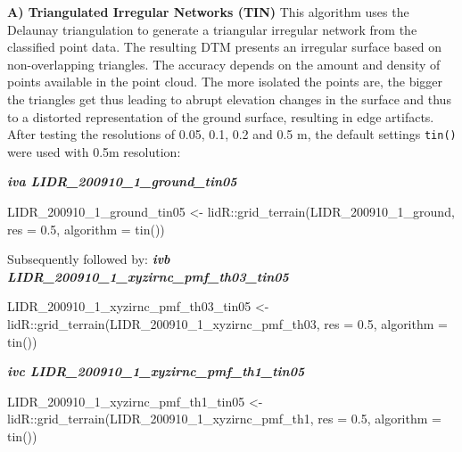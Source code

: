 \documentclass[
  12pt,
]{article}
\newenvironment{Shaded}{\begin{snugshade}}{\end{snugshade}}
\newcommand{\AttributeTok}[1]{\textcolor[rgb]{0.77,0.63,0.00}{#1}}
\newcommand{\FloatTok}[1]{\textcolor[rgb]{0.00,0.00,0.81}{#1}}
\newcommand{\FunctionTok}[1]{\textcolor[rgb]{0.00,0.00,0.00}{#1}}
\newcommand{\NormalTok}[1]{#1}
\newcommand{\OtherTok}[1]{\textcolor[rgb]{0.56,0.35,0.01}{#1}}
\newcommand{\SpecialCharTok}[1]{\textcolor[rgb]{0.00,0.00,0.00}{#1}}
\begin{document}
\textbf{A) Triangulated Irregular Networks (TIN)}
\newline
This algorithm uses the Delaunay triangulation to generate a triangular irregular network from the classified point data. The resulting DTM presents an irregular surface based on non-overlapping triangles. The accuracy depends on the amount and density of points available in the point cloud. The more isolated the points are, the bigger the triangles get thus leading to abrupt elevation changes in the surface and thus to a distorted representation of the ground surface, resulting in edge artifacts.
After testing the resolutions of 0.05, 0.1, 0.2 and 0.5 m, the default settings \texttt{tin()} were used with 0.5m resolution:

\textbf{\emph{iva LIDR\_200910\_1\_ground\_tin05}}

\begin{Shaded}
\begin{Highlighting}[]
\NormalTok{LIDR\_200910\_1\_ground\_tin05 }\OtherTok{\textless{}{-}}\NormalTok{ lidR}\SpecialCharTok{::}\FunctionTok{grid\_terrain}\NormalTok{(LIDR\_200910\_1\_ground, }\AttributeTok{res =} \FloatTok{0.5}\NormalTok{,}
    \AttributeTok{algorithm =} \FunctionTok{tin}\NormalTok{())}
\end{Highlighting}
\end{Shaded}

Subsequently followed by:
\textbf{\emph{ivb LIDR\_200910\_1\_xyzirnc\_pmf\_th03\_tin05}}

\begin{Shaded}
\begin{Highlighting}[]
\NormalTok{LIDR\_200910\_1\_xyzirnc\_pmf\_th03\_tin05 }\OtherTok{\textless{}{-}}\NormalTok{ lidR}\SpecialCharTok{::}\FunctionTok{grid\_terrain}\NormalTok{(LIDR\_200910\_1\_xyzirnc\_pmf\_th03,}
    \AttributeTok{res =} \FloatTok{0.5}\NormalTok{, }\AttributeTok{algorithm =} \FunctionTok{tin}\NormalTok{())}
\end{Highlighting}
\end{Shaded}

\textbf{\emph{ivc LIDR\_200910\_1\_xyzirnc\_pmf\_th1\_tin05}}

\begin{Shaded}
\begin{Highlighting}[]
\NormalTok{LIDR\_200910\_1\_xyzirnc\_pmf\_th1\_tin05 }\OtherTok{\textless{}{-}}\NormalTok{ lidR}\SpecialCharTok{::}\FunctionTok{grid\_terrain}\NormalTok{(LIDR\_200910\_1\_xyzirnc\_pmf\_th1,}
    \AttributeTok{res =} \FloatTok{0.5}\NormalTok{, }\AttributeTok{algorithm =} \FunctionTok{tin}\NormalTok{())}
\end{Highlighting}
\end{Shaded}
\end{document}
